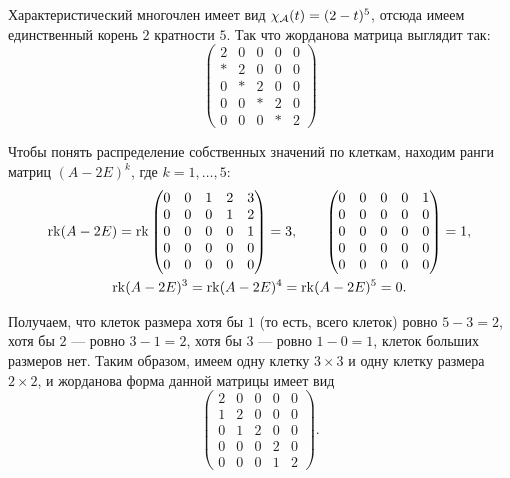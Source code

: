 \begin{solution}
	Характеристический многочлен имеет вид $\chi_{\mathcal{A}}(t) = (2 - t)^5$, отсюда имеем единственный корень $2$ кратности $5$. Так что жорданова матрица выглядит так:
	\[
		\begin{pmatrix}
			2 & 0 & 0 & 0 & 0\\
			\ast & 2 & 0 & 0 & 0\\
			0 & \ast & 2 & 0 & 0\\
			0 & 0 & \ast & 2 & 0\\
			0 & 0 & 0 & \ast & 2
		\end{pmatrix}
	\]

	Чтобы понять распределение собственных значений по клеткам, находим ранги матриц $(A - 2E)^k$, где $k = 1, \ldots, 5$:
	\begin{gather*}
		\operatorname{rk}(A - 2E) = \operatorname{rk}
		\begin{pmatrix}
			0 & 0 & 1 & 2 & 3\\
			0 & 0 & 0 & 1 & 2\\
			0 & 0 & 0 & 0 & 1\\
			0 & 0 & 0 & 0 & 0\\
			0 & 0 & 0 & 0 & 0
		\end{pmatrix} = 3,\qquad
		\begin{pmatrix}
			0 & 0 & 0 & 0 & 1\\
			0 & 0 & 0 & 0 & 0\\
			0 & 0 & 0 & 0 & 0\\
			0 & 0 & 0 & 0 & 0\\
			0 & 0 & 0 & 0 & 0
		\end{pmatrix} = 1,\\
		\operatorname{rk}(A - 2E)^3 = \operatorname{rk}(A - 2E)^4 = \operatorname{rk}(A - 2E)^5 = 0.
	\end{gather*}

	Получаем, что клеток размера хотя бы $1$ (то есть, всего клеток) ровно $5 - 3 = 2$, хотя бы $2$ --- ровно $3 - 1 = 2$, хотя бы $3$ --- ровно $1 - 0 = 1$, клеток больших размеров нет. Таким образом, имеем одну клетку $3 \times 3$ и одну клетку размера $2 \times 2$, и жорданова форма данной матрицы имеет вид
	\[
		\begin{pmatrix}
			2 & 0 & 0 & 0 & 0\\
			1 & 2 & 0 & 0 & 0\\
			0 & 1 & 2 & 0 & 0\\
			0 & 0 & 0 & 2 & 0\\
			0 & 0 & 0 & 1 & 2
		\end{pmatrix}.
	\]
\end{solution}

